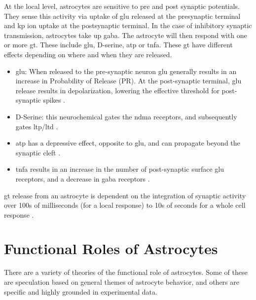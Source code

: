 \documentclass[conference]{IEEEtran}
\newcommand{\ca}{\gls{ca}\textrm{ }}
\newcommand{\kp}{\gls{kp}\textrm{ }}
\begin{document}
At the local level, astrocytes are sensitive to pre and post synaptic
potentials. They sense this activity via uptake of \gls{glu} released at the
presynaptic terminal and \kp ion uptake at the postsynaptic terminal. In the
case of inhibitory synaptic transmission, astrocytes take up \gls{gaba}. The
astrocyte will then respond with one or more \gls{gt}. These include \gls{glu},
D-serine, \gls{atp} or \gls{tnfa}. These \gls{gt} have different effects
depending on where and when they are released.

\begin{itemize}
\item \Gls{glu}: When released to the pre-synaptic neuron \gls{glu} generally
  results in an increase in Probability of Release (PR). At the
  post-synaptic terminal, \gls{glu} release results in depolarization, lowering
  the effective threshold for post-synaptic spikes \parencite{pitta_2016}.
\item D-Serine: this neurochemical gates the \gls{ndma} receptors, and
  subsequently gates \gls{ltp}/\gls{ltd} \parencite{mederos_2018}.
\item \Gls{atp} has a depressive effect, opposite to \gls{glu}, and can
  propagate beyond the synaptic cleft \parencite{mederos_2018}.
\item \Gls{tnfa} results in an increase in the number of post-synaptic
  surface \gls{glu} receptors, and a decrease in \gls{gaba} receptors
  \parencite{chung_2015}.
\end{itemize}

\Gls{gt} release from an astrocyte is dependent on the integration of
synaptic activity over 100s of milliseconds (for a local response)
\parencite{pitta_2016} to 10s of seconds for a whole cell response
\parencite{mederos_2018}.

\section{Functional Roles of Astrocytes}

There are a variety of theories of the functional role of astrocytes.
Some of these are speculation based on general themes of astrocyte behavior,
and others are specific and highly grounded in experimental data.
\end{document}
